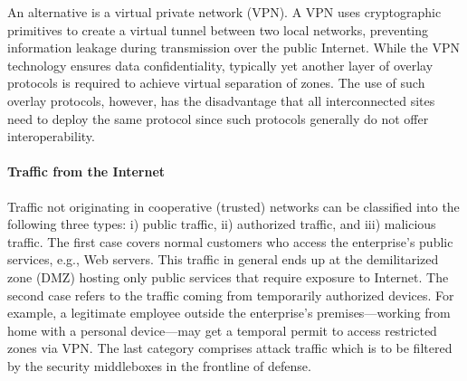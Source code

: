 An alternative is a virtual private
network (VPN). A VPN uses cryptographic primitives to create a virtual tunnel between two
local networks, preventing information leakage during transmission over the public Internet.
While the VPN technology ensures data confidentiality, typically yet another layer of overlay
protocols is required to achieve virtual separation of zones. The use of such overlay
protocols, however, has the disadvantage that all interconnected sites need to deploy the same
protocol since such protocols generally do not offer interoperability.

\paragraph{Traffic from the Internet}
Traffic not originating in cooperative (trusted) networks can be classified
into the following three types: i) public traffic, ii) authorized traffic, and iii)
malicious traffic. The first case covers normal customers who access the enterprise's
public services, e.g., Web servers. This traffic in general ends up at the demilitarized zone
(DMZ) hosting only public services that require exposure to Internet.
The second case refers to the traffic coming from temporarily authorized devices. For example,
a legitimate employee outside the enterprise's premises---working from home with a personal
device---may get a temporal permit to access restricted zones via VPN. The last
category comprises attack traffic which is to be filtered by the security middleboxes in the
frontline of defense.


